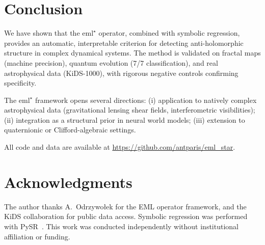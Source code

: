 \documentclass[12pt,a4paper]{article}
\newcommand{\emlstar}{\mathrm{eml}^{\star}}
\begin{document}
\section{Conclusion}
\label{sec:conclusion}

We have shown that the $\emlstar$ operator, combined with symbolic
regression, provides an automatic, interpretable criterion for
detecting anti-holomorphic structure in complex dynamical systems.
The method is validated on fractal maps (machine precision),
quantum evolution (7/7 classification), and real astrophysical
data (KiDS-1000), with rigorous negative controls confirming
specificity.

The $\emlstar$ framework opens several directions:
(i) application to natively complex astrophysical data
(gravitational lensing shear fields, interferometric visibilities);
(ii) integration as a structural prior in neural world models;
(iii) extension to quaternionic or Clifford-algebraic settings.

All code and data are available at
\url{https://github.com/antparis/eml_star}.


\section*{Acknowledgments}

The author thanks A.~Odrzywołek for the EML operator framework,
and the KiDS collaboration for public data access.
Symbolic regression was performed with
PySR~\citep{cranmer2023pysr}.
This work was conducted independently without institutional
affiliation or funding.
\end{document}
